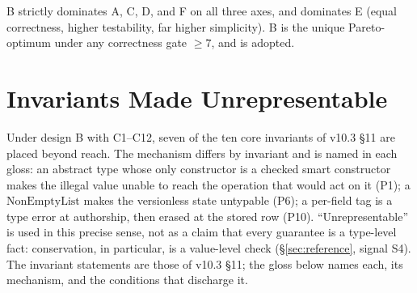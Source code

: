 \documentclass[11pt,a4paper]{article}
\begin{document}
\noindent B strictly dominates A, C, D, and F on all three axes, and dominates E (equal
correctness, higher testability, far higher simplicity). B is the unique Pareto-optimum
under any correctness gate $\geq 7$, and is adopted.

\section{Invariants Made Unrepresentable}
\label{sec:unreachable}

Under design B with C1--C12, seven of the ten core invariants of v10.3 \S 11 are placed
beyond reach. The mechanism differs by invariant and is named in each gloss: an abstract type
whose only constructor is a checked smart constructor makes the illegal value unable to reach
the operation that would act on it (P1); a $\mathrm{NonEmptyList}$ makes the versionless state
untypable (P6); a per-field tag is a type error at authorship, then erased at the stored row
(P10). ``Unrepresentable'' is used in this precise sense, not as a claim that every guarantee
is a type-level fact: conservation, in particular, is a value-level check
(\S\ref{sec:reference}, signal S4). The invariant statements are those of v10.3 \S 11; the
gloss below names each, its mechanism, and the conditions that discharge it.
\end{document}
